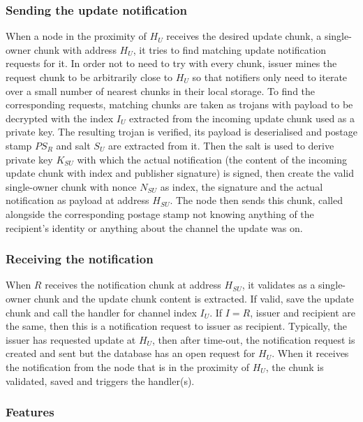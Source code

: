 \subsubsection{Sending the update notification}

When a node in the proximity of $H_U$ receives the desired update chunk, a single-owner chunk with address $H_U$, it tries to find matching update notification requests for it. In order not to need to try with every chunk, issuer mines the request chunk to be arbitrarily close to $H_U$ so that notifiers only need to iterate over a small number of nearest chunks in their local storage. To find the corresponding requests, matching chunks are taken as trojans with payload to be decrypted with the index $I_U$ extracted from the incoming update chunk used as a private key. The resulting trojan is verified, its payload is deserialised and postage stamp $PS_R$ and salt $S_U$ are extracted from it. Then the salt is used to derive private key $K_{SU}$ with which the actual notification (the content of the incoming update chunk with index and publisher signature) is signed, then create the valid single-owner chunk with nonce $N_{SU}$ as index, the signature and the actual notification as payload at address $H_{SU}$. The node then sends this chunk, called  alongside the corresponding postage stamp not knowing anything of the recipient's identity or anything about the channel the update was on.


\subsubsection{Receiving the notification}

When $R$ receives the notification chunk at address $H_{SU}$, it validates as a single-owner chunk and the update chunk content is extracted. If valid, save the update chunk and call the handler for channel index $I_U$.
If $I=R$, issuer and recipient are the same, then this is a notification request to issuer as recipient.
Typically, the issuer has requested update at $H_U$, then after time-out, the notification request is created and sent but the database has an open request for $H_U$. When it receives the notification from the node that is in the proximity of $H_U$, the chunk is validated, saved and triggers the handler(s).


\subsubsection{Features}

